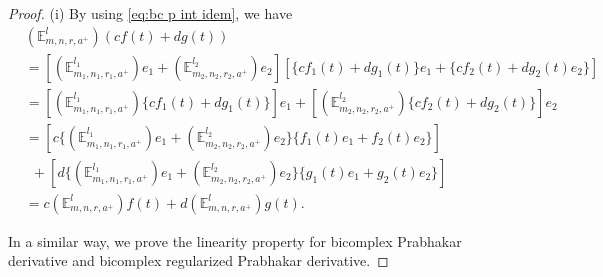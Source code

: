 \documentclass[a4paper,12pt]{article}
\theoremstyle{remark}
\begin{document}
\begin{proof}(i)
By using \eqref{eq:bc p int idem}, we have
\begin{equation}
\begin{split}
&(\mathbb{E}_{m,n,r,a^+}^l)( cf(t)+dg(t)) \\
&=\left[  (\mathbb{E}_{m_1,n_1,r_1,a^+}^{l_1})e_1+	(\mathbb{E}_{m_2,n_2,r_2,a^+}^{l_2})e_2\right] \left[\{cf_1(t)+dg_1(t)\} e_1+\{cf_2(t)+dg_2(t)e_2\} \right] \\
&=\left[ (\mathbb{E}_{m_1,n_1,r_1,a^+}^{l_1})\{cf_1(t)+dg_1(t)\}\right] e_1+\left[ (\mathbb{E}_{m_2,n_2,r_2,a^+}^{l_2})\{cf_2(t)+dg_2(t)\}\right] e_2\\
&=\left[c\{ (\mathbb{E}_{m_1,n_1,r_1,a^+}^{l_1})e_1+(\mathbb{E}_{m_2,n_2,r_2,a^+}^{l_2})e_2\}\{f_1(t)e_1+f_2(t)e_2\}\right] \\
&~~+\left[d\{ (\mathbb{E}_{m_1,n_1,r_1,a^+}^{l_1})e_1+(\mathbb{E}_{m_2,n_2,r_2,a^+}^{l_2})e_2\}\{g_1(t)e_1+g_2(t)e_2\}\right] \\
&=c(\mathbb{E}_{m,n,r,a^+}^l) f(t)+	d(\mathbb{E}_{m,n,r,a^+}^l)g(t).
\end{split}
\end{equation}

\noindent In a similar way, we prove the linearity property for bicomplex Prabhakar derivative and bicomplex  regularized Prabhakar derivative.
\end{proof}
\end{document}
